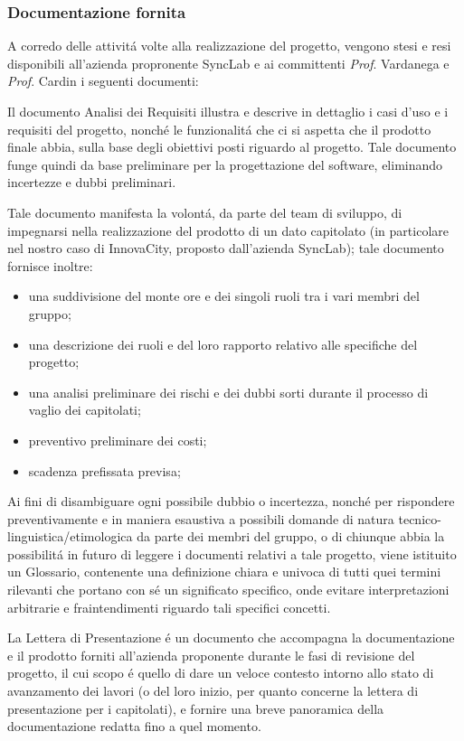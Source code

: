 \subsubsection{Documentazione fornita}
A corredo delle attivitá volte alla realizzazione del progetto, vengono stesi e resi disponibili all'azienda propronente SyncLab e ai committenti \textit{Prof}. Vardanega e \textit{Prof}. Cardin i seguenti documenti:

Il documento Analisi dei Requisiti illustra e descrive in dettaglio i casi d'uso e i requisiti del progetto, nonché le funzionalitá che ci si aspetta che il prodotto finale abbia, sulla base degli obiettivi posti riguardo al progetto. Tale documento funge quindi da base preliminare per la progettazione del software, eliminando incertezze e dubbi preliminari.

Tale documento manifesta la volontá, da parte del team di sviluppo, di impegnarsi nella realizzazione del prodotto di un dato capitolato (in particolare nel nostro caso di InnovaCity, proposto dall'azienda SyncLab); tale documento fornisce inoltre:

\begin{itemize}
    \item una suddivisione del monte ore e dei singoli ruoli tra i vari membri del gruppo;
    \item una descrizione dei ruoli e del loro rapporto relativo alle specifiche del progetto;
    \item una analisi preliminare dei rischi e dei dubbi sorti durante il processo di vaglio dei capitolati;
    \item preventivo preliminare dei costi;
    \item scadenza prefissata previsa;
\end{itemize}

Ai fini di disambiguare ogni possibile dubbio o incertezza, nonché per rispondere preventivamente e in maniera esaustiva a possibili domande di natura tecnico-linguistica/etimologica da parte dei membri del gruppo, o di chiunque abbia la possibilitá in futuro di leggere i documenti relativi a tale progetto, viene istituito un Glossario, contenente una definizione chiara e univoca di tutti quei termini rilevanti che portano con sé un significato specifico, onde evitare interpretazioni arbitrarie e fraintendimenti riguardo tali specifici concetti.

La Lettera di Presentazione é un documento che accompagna la documentazione e il prodotto forniti all'azienda proponente durante le fasi di revisione del progetto, il cui scopo é quello di dare un veloce contesto intorno allo stato di avanzamento dei lavori (o del loro inizio, per quanto concerne la lettera di presentazione per i capitolati), e fornire una breve panoramica della documentazione redatta fino a quel momento. 

